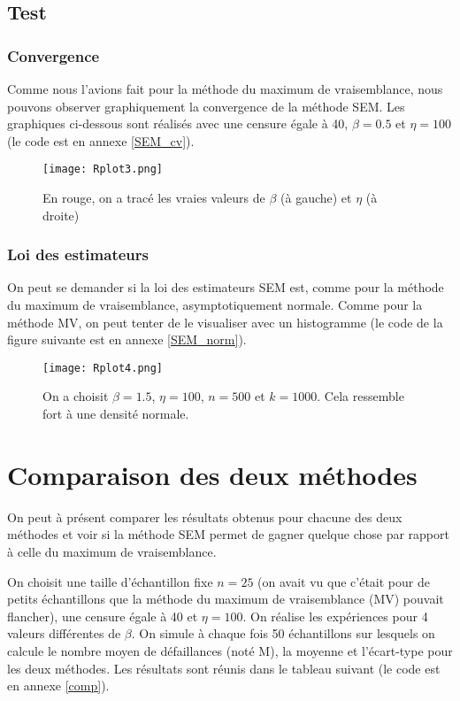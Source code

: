 \documentclass[a4paper]{report}
\begin{document}
 \section{Test}
 
 \subsection{Convergence}
 
 Comme nous l'avions fait pour la méthode du maximum de vraisemblance, nous pouvons observer graphiquement la convergence de la méthode SEM. Les graphiques ci-dessous sont réalisés avec une censure égale à 40, $\beta=0.5$ et $\eta=100$ (le code est en annexe \ref{SEM_cv}).
 
\begin{figure}[!ht]
	\centering
     	\texttt{[image: Rplot3.png]}

	\caption{En rouge, on a tracé les vraies valeurs de $\beta$ (à gauche) et $\eta$ (à droite)}
\end{figure}  

 \subsection{Loi des estimateurs}
 
 On peut se demander si la loi des estimateurs SEM est, comme pour la méthode du maximum de vraisemblance, asymptotiquement normale. Comme pour la méthode MV, on peut tenter de le visualiser avec un histogramme (le code de la figure suivante est en annexe \ref{SEM_norm}). 
 
 \begin{figure}[!ht]
	\centering
     	\texttt{[image: Rplot4.png]}

	\caption{On a choisit $\beta=1.5$, $\eta=100$, $n=500$ et $k=1000$. Cela ressemble fort à une densité normale.}
\end{figure}
  
\chapter{Comparaison des deux méthodes}

 On peut à présent comparer les résultats obtenus pour chacune des deux méthodes et voir si la méthode SEM permet de gagner quelque chose par rapport à celle du maximum de vraisemblance. 
 
 On choisit une taille d'échantillon fixe $n=25$ (on avait vu que c'était pour de petits échantillons que la méthode du maximum de vraisemblance (MV) pouvait flancher), une censure égale à 40 et $\eta=100$. On réalise les expériences pour 4 valeurs différentes de $\beta$. On simule à chaque fois 50 échantillons sur lesquels on calcule le nombre moyen de défaillances (noté M), la moyenne et l'écart-type pour les deux méthodes. Les résultats sont réunis dans le tableau suivant (le code est en annexe \ref{comp}).
 
\end{document}
